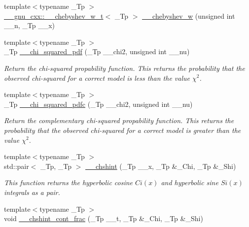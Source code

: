 \begin{DoxyCompactItemize}
\item 
{\footnotesize template$<$typename \+\_\+\+Tp $>$ }\\\hyperlink{struct____gnu__cxx_1_1____chebyshev__w__t}{\+\_\+\+\_\+gnu\+\_\+cxx\+::\+\_\+\+\_\+chebyshev\+\_\+w\+\_\+t}$<$ \+\_\+\+Tp $>$ \hyperlink{namespacestd_1_1____detail_ab2a0ec347e56c0fae435c8da507c578c}{\+\_\+\+\_\+chebyshev\+\_\+w} (unsigned int \+\_\+\+\_\+n, \+\_\+\+Tp \+\_\+\+\_\+x)
\item 
{\footnotesize template$<$typename \+\_\+\+Tp $>$ }\\\+\_\+\+Tp \hyperlink{namespacestd_1_1____detail_a2125cbbc3fd3aad11c8025478c7a14fe}{\+\_\+\+\_\+chi\+\_\+squared\+\_\+pdf} (\+\_\+\+Tp \+\_\+\+\_\+chi2, unsigned int \+\_\+\+\_\+nu)
\begin{DoxyCompactList}\small\item\em Return the chi-\/squared propability function. This returns the probability that the observed chi-\/squared for a correct model is less than the value $ \chi^2 $. \end{DoxyCompactList}\item 
{\footnotesize template$<$typename \+\_\+\+Tp $>$ }\\\+\_\+\+Tp \hyperlink{namespacestd_1_1____detail_aa62c16dd75a7411400c7082e6b2b246b}{\+\_\+\+\_\+chi\+\_\+squared\+\_\+pdfc} (\+\_\+\+Tp \+\_\+\+\_\+chi2, unsigned int \+\_\+\+\_\+nu)
\begin{DoxyCompactList}\small\item\em Return the complementary chi-\/squared propability function. This returns the probability that the observed chi-\/squared for a correct model is greater than the value $ \chi^2 $. \end{DoxyCompactList}\item 
{\footnotesize template$<$typename \+\_\+\+Tp $>$ }\\std\+::pair$<$ \+\_\+\+Tp, \+\_\+\+Tp $>$ \hyperlink{namespacestd_1_1____detail_aa07abc4dac6cf589ccd12d3ce40277cf}{\+\_\+\+\_\+chshint} (\+\_\+\+Tp \+\_\+\+\_\+x, \+\_\+\+Tp \&\+\_\+\+Chi, \+\_\+\+Tp \&\+\_\+\+Shi)
\begin{DoxyCompactList}\small\item\em This function returns the hyperbolic cosine $ Ci(x) $ and hyperbolic sine $ Si(x) $ integrals as a pair. \end{DoxyCompactList}\item 
{\footnotesize template$<$typename \+\_\+\+Tp $>$ }\\void \hyperlink{namespacestd_1_1____detail_a07da2303d36d77bfad393a7b8ebdf686}{\+\_\+\+\_\+chshint\+\_\+cont\+\_\+frac} (\+\_\+\+Tp \+\_\+\+\_\+t, \+\_\+\+Tp \&\+\_\+\+Chi, \+\_\+\+Tp \&\+\_\+\+Shi)

\end{DoxyCompactItemize}
